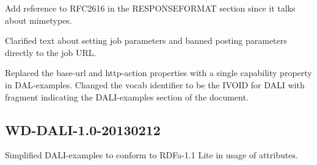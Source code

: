 \documentclass[11pt,letter]{ivoa}
\begin{document}
Add reference to RFC2616 in the RESPONSEFORMAT section since it talks about
mimetypes.

Clarified text about setting job parameters and banned posting parameters
directly to the job URL.

Replaced the base-url and http-action properties with a single capability
property in DAL-examples. Changed the vocab identifier to be the IVOID for DALI
with fragment indicating the DALI-examples section of the document.

\subsection{WD-DALI-1.0-20130212}
Simplified DALI-examples to conform to RDFa-1.1 Lite in usage of attributes.


\end{document}

